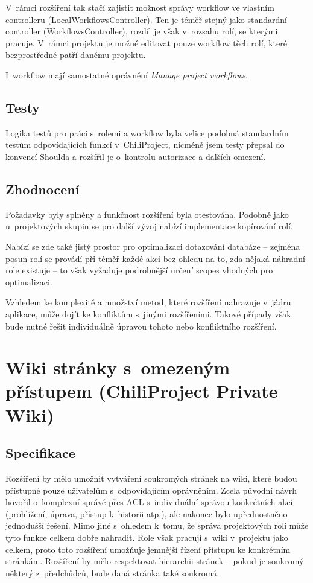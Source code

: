 \documentclass[thesis=B,czech]{FITthesis}[2012/05/02]
\begin{document}
V~rámci rozšíření tak stačí zajistit možnost správy workflow ve vlastním
controlleru (LocalWorkflowsController). Ten je téměř stejný jako
standardní controller (WorkflowsController), rozdíl je však v~rozsahu
rolí, se kterými pracuje. V~rámci projektu je možné editovat pouze
workflow těch rolí, které bezprostředně patří danému projektu.

I~workflow mají samostatné oprávnění \emph{Manage project workflows}.

\subsection{Testy}

Logika testů pro práci s~rolemi a workflow byla velice podobná
standardním testům odpovídajících funkcí v~ChiliProject, nicméně jsem
testy přepsal do konvencí Shoulda a rozšířil je o~kontrolu autorizace a
dalších omezení.

\subsection{Zhodnocení}

Požadavky byly splněny a funkčnost rozšíření byla otestována. Podobně
jako u~projektových skupin se pro další vývoj
nabízí implementace kopírování rolí.

Nabízí se zde také jistý prostor pro optimalizaci dotazování databáze -- zejména
posun rolí se provádí při téměř každé akci bez ohledu na to, zda nějaká
náhradní role existuje -- to však vyžaduje podrobnější určení
\glspl{scope} vhodných pro optimalizaci.

Vzhledem ke komplexitě a množství metod, které rozšíření nahrazuje
v~jádru aplikace, může dojít ke konfliktům s~jinými rozšířeními. Takové
případy však bude nutné řešit individuálně úpravou tohoto nebo
konfliktního rozšíření.

\section[Wiki stránky s~omezeným přístupem]{Wiki stránky s~omezeným přístupem (ChiliProject Private
Wiki)}
\label{sec:private_wiki}

\subsection{Specifikace}

Rozšíření by mělo umožnit vytváření soukromých stránek na \gls{wiki},
které budou přístupné pouze uživatelům s~odpovídajícím oprávněním. Zcela
původní návrh hovořil o~komplexní správě přes \gls{ACL} s~individuální
správou konkrétních akcí (prohlížení, úprava, přístup k~historii atp.),
ale nakonec bylo upřednostněno jednodušší řešení. Mimo jiné s~ohledem k~tomu, že
správa projektových rolí může tyto funkce celkem dobře nahradit. Role
však pracují s~wiki v~projektu jako celkem, proto toto rozšíření umožňuje
jemnější řízení přístupu ke konkrétním stránkám. Rozšíření by mělo
respektovat hierarchii stránek -- pokud je soukromý některý
z~předchůdců, bude daná stránka také soukromá.
\end{document}
